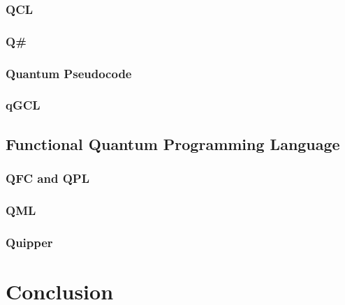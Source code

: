 \documentclass[11pt, conference, onecolumn]{IEEEtran}
\begin{document}
\subsubsection{QCL}

\subsubsection{Q\#}

\subsubsection{Quantum Pseudocode}

\subsubsection{qGCL}
 
\subsection{Functional Quantum Programming Language}

\subsubsection{QFC and QPL}

\subsubsection{QML}

\subsubsection{Quipper}


\section{Conclusion}



\end{document}

